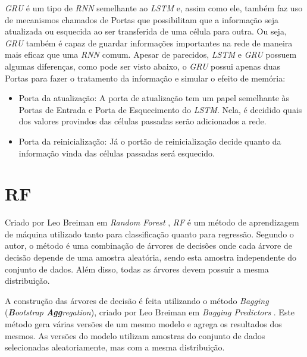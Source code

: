 \textit{\acrshort{GRU}} é um tipo de \textit{\acrshort{RNN}} semelhante ao \textit{\acrshort{LSTM}} e, assim como ele, também faz uso de mecanismos chamados de Portas que possibilitam que a informação seja atualizada ou esquecida ao ser transferida de uma célula para outra. Ou seja, \textit{\acrshort{GRU}} também é capaz de guardar informações importantes na rede de maneira mais eficaz que uma \textit{\acrshort{RNN}} comum. Apesar de parecidos, \textit{\acrshort{LSTM}} e \textit{\acrshort{GRU}} possuem algumas diferenças, como pode ser visto abaixo, o \textit{\acrshort{GRU}} possui apenas duas Portas para fazer o tratamento da informação e simular o efeito de memória:

\begin{itemize}
    \item Porta da atualização: A porta de atualização tem um papel semelhante às Portas de Entrada e Porta de Esquecimento do \textit{\acrshort{LSTM}}. Nela, é decidido quais dos valores provindos das células passadas serão adicionados a rede.
    \item Porta da reinicialização: Já o portão de reinicialização decide quanto da informação vinda das células passadas será esquecido.
\end{itemize}

\section{\acrfull{RF}}

Criado por Leo Breiman em \textit{Random Forest} \cite{Breiman:2001:RF:570181.570182}, \textit{\acrshort{RF}} é um método de aprendizagem de máquina utilizado tanto para classificação quanto para regressão. Segundo o autor, o método é uma combinação de árvores de decisões onde cada árvore de decisão depende de uma amostra aleatória, sendo esta amostra independente do conjunto de dados. Além disso, todas as árvores devem possuir a mesma distribuição. 

A construção das árvores de decisão é feita utilizando o método \textit{Bagging} (\textit{\textbf{B}ootstrap \textbf{Agg}regation}), criado por Leo Breiman em \textit{Bagging Predictors} \cite{Breiman:1996:BP:231986.231989}. Este método gera várias versões de um mesmo modelo e agrega os resultados dos mesmos. As versões do modelo utilizam amostras do conjunto de dados selecionadas aleatoriamente, mas com a mesma distribuição.

